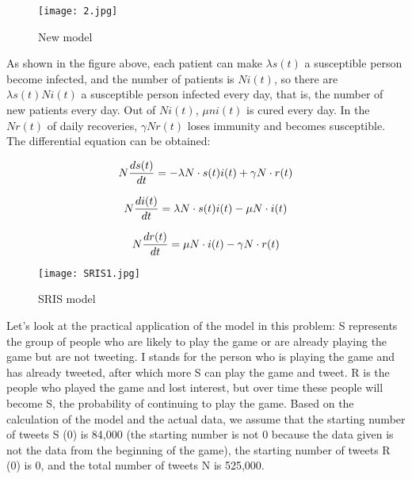\documentclass[12pt]{article}  %
\begin{document}
\begin{figure}[htbp]
	\centering
	\texttt{[image: 2.jpg]}
	\caption{New model}\label{fig:result}
\end{figure}

As shown in the figure above, each patient can make $\lambda s(t)$ a susceptible person become infected, and the number of patients is $ N i(t)$, so there are $\lambda s(t) N i(t)$ a susceptible person infected every day, that is, the number of new patients every day.
Out of $ N i(t)$, $\mu n  i(t)$ is cured every day.
In the $Nr(t)$ of daily recoveries, $ \gamma N r(t)$ loses immunity and becomes susceptible.
The differential equation can be obtained:

\begin{equation}
\large N\frac{ds(t)}{dt} =-\lambda N\cdot s(t)i(t)+\gamma N\cdot r(t)
\end{equation}

\begin{equation}
\large N\frac{di(t)}{dt} =\lambda N\cdot s(t)i(t)-\mu N\cdot i(t)
\end{equation}

\begin{equation}
\large N\frac{dr(t)}{dt} =\mu N\cdot i(t)-\gamma N\cdot r(t)
\end{equation}

\begin{figure}[htbp]
	\centering
	\texttt{[image: SRIS1.jpg]}
	\caption{SRIS model}\label{fig:result}
\end{figure}



Let's look at the practical application of the model in this problem:
S represents the group of people who are likely to play the game or are already playing the game but are not tweeting.
I stands for the person who is playing the game and has already tweeted, after which more S can play the game and tweet.
R is the people who played the game and lost interest, but over time these people will become S, the probability of continuing to play the game.
Based on the calculation of the model and the actual data, we assume that the starting number of tweets S (0) is 84,000 (the starting number is not 0 because the data given is not the data from the beginning of the game), the starting number of tweets R (0) is 0, and the total number of tweets N is 525,000.
\end{document}
